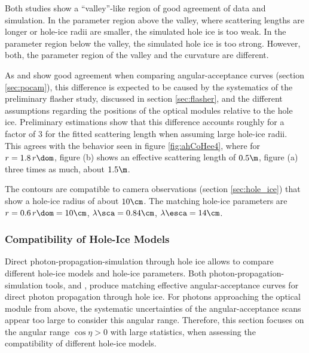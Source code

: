 Both studies show a ``valley''-like region of good agreement of data and simulation. In the parameter region above the valley, where scattering lengths are longer or hole-ice radii are smaller, the simulated hole ice is too weak. In the parameter region below the valley, the simulated hole ice is too strong. However, both, the parameter region of the valley and the curvature are different.

As \clsim and \ppc show good agreement when comparing angular-acceptance curves (section \ref{sec:pocam}), this difference is expected to be caused by the systematics of the preliminary flasher study, discussed in section \ref{sec:flasher}, and the different assumptions regarding the positions of the optical modules relative to the hole ice. Preliminary estimations show that this difference accounts roughly for a factor of $3$ for the fitted scattering length when assuming large hole-ice radii. This agrees with the behavior seen in figure \ref{fig:ahCoHee4}, where for $r=1.8\,r\dom$, figure (b) shows an effective scattering length of $0.5\m$, figure (a) three times as much, about $1.5\m$.


The  contours are compatible to camera observations (section \ref{sec:hole_ice}) that show a hole-ice radius of about $10\cm$. \cite{rongenswedishcamera} The matching  hole-ice parameters are $r = 0.6\,r\dom = 10\cm$, $\lambda\sca = 0.84\cm$, $\lambda\esca = 14\cm$. \cite{martinspicehddard}

\subsubsection{Compatibility of Hole-Ice Models}
\label{sec:compatibility_of_hole_ice_parameters}

Direct photon-propagation-simulation through hole ice allows to compare different hole-ice models and hole-ice parameters.
Both photon-propagation-simulation tools, \ppc and \clsim, produce matching effective angular-acceptance curves for direct photon propagation through hole ice. For photons approaching the optical module from above, the systematic uncertainties of the \clsim angular-acceptance scans appear too large to consider this angular range. Therefore, this section focuses on the angular range $\cos \eta > 0$ with large statistics, when assessing the compatibility of different hole-ice models.

